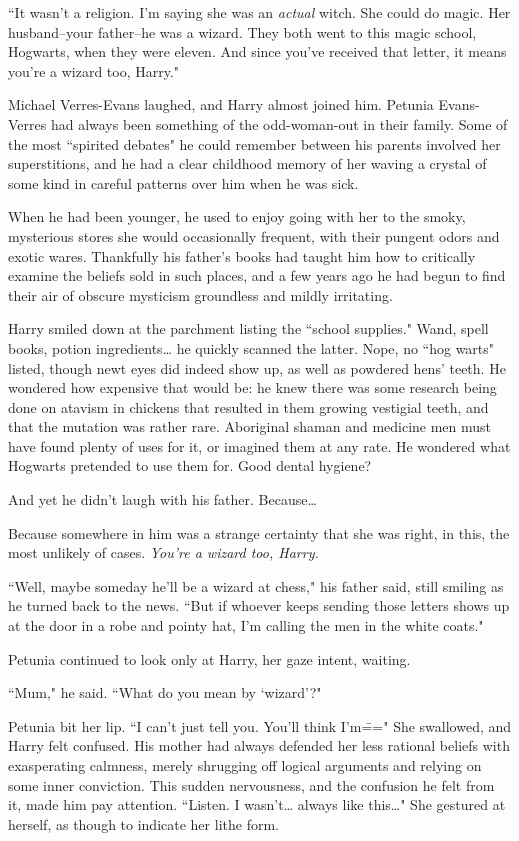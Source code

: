 ``It wasn't a religion. I'm saying she was an \emph{actual} witch. She could do magic. Her husband\---your father\---he was a wizard. They both went to this magic school, Hogwarts, when they were eleven. And since you've received that letter, it means you're a wizard too, Harry."

Michael Verres-Evans laughed, and Harry almost joined him. Petunia Evans-Verres had always been something of the odd-woman-out in their family. Some of the most ``spirited debates" he could remember between his parents involved her superstitions, and he had a clear childhood memory of her waving a crystal of some kind in careful patterns over him when he was sick.

When he had been younger, he used to enjoy going with her to the smoky, mysterious stores she would occasionally frequent, with their pungent odors and exotic wares. Thankfully his father's books had taught him how to critically examine the beliefs sold in such places, and a few years ago he had begun to find their air of obscure mysticism groundless and mildly irritating.

Harry smiled down at the parchment listing the ``school supplies." Wand, spell books, potion ingredients{\ldots} he quickly scanned the latter. Nope, no ``hog warts" listed, though newt eyes did indeed show up, as well as powdered hens' teeth. He wondered how expensive that would be: he knew there was some research being done on atavism in chickens that resulted in them growing vestigial teeth, and that the mutation was rather rare. Aboriginal shaman and medicine men must have found plenty of uses for it, or imagined them at any rate. He wondered what Hogwarts pretended to use them for. Good dental hygiene?

And yet he didn't laugh with his father. Because{\ldots}

Because somewhere in him was a strange certainty that she was right, in this, the most unlikely of cases. \emph{You're a wizard too, Harry.}

``Well, maybe someday he'll be a wizard at chess," his father said, still smiling as he turned back to the news. ``But if whoever keeps sending those letters shows up at the door in a robe and pointy hat, I'm calling the men in the white coats."

Petunia continued to look only at Harry, her gaze intent, waiting.

``Mum," he said. ``What do you mean by `wizard'?"

Petunia bit her lip. ``I can't just tell you. You'll think I'm\===" She swallowed, and Harry felt confused. His mother had always defended her less rational beliefs with exasperating calmness, merely shrugging off logical arguments and relying on some inner conviction. This sudden nervousness, and the confusion he felt from it, made him pay attention. ``Listen. I wasn't{\ldots} always like this{\ldots}" She gestured at herself, as though to indicate her lithe form.

